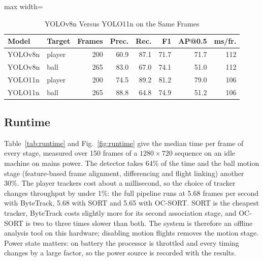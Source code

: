 \documentclass[conference]{IEEEtran}
\begin{document}
\begin{table}[t]
\caption{YOLOv8n Versus YOLO11n on the Same Frames}
\label{tab:models}
\centering
\footnotesize
\setlength{\tabcolsep}{3.5pt}
\begin{adjustbox}{max width=\columnwidth}
\begin{tabular}{@{}llrrrrrr@{}}
\toprule
Model & Target & Frames & Prec. & Rec. & F1 & AP@0.5 & ms/fr. \\
\midrule
YOLOv8n & player & 200 & 60.9 & 87.1 & 71.7 & 71.7 & 112 \\
YOLOv8n & ball & 265 & 83.0 & 67.0 & 74.1 & 51.0 & 112 \\
YOLO11n & player & 200 & 74.5 & 89.2 & 81.2 & 79.0 & 106 \\
YOLO11n & ball & 265 & 88.8 & 64.8 & 74.9 & 51.2 & 106 \\
\bottomrule
\end{tabular}
\end{adjustbox}
\end{table}

\subsection{Runtime}
Table~\ref{tab:runtime} and Fig.~\ref{fig:runtime} give the median time per
frame of every stage, measured over 150 frames of a $1280\times720$ sequence on
an idle machine on mains power. The detector takes 64\% of the time and the ball
motion stage (feature-based frame alignment, differencing and flight linking)
another 30\%. The player trackers cost about a millisecond, so the choice of
tracker changes throughput by under 1\%: the full pipeline runs at 5.68 frames per second with
ByteTrack, 5.68 with SORT and 5.65 with OC-SORT. SORT is the
cheapest tracker, ByteTrack costs slightly more for its second association stage,
and OC-SORT is two to three times slower than both. The system is therefore an
offline analysis tool on this hardware; disabling motion flights removes the
motion stage. Power state matters: on battery the processor is throttled and every
timing changes by a large factor, so the power source is recorded with the results.
\end{document}
